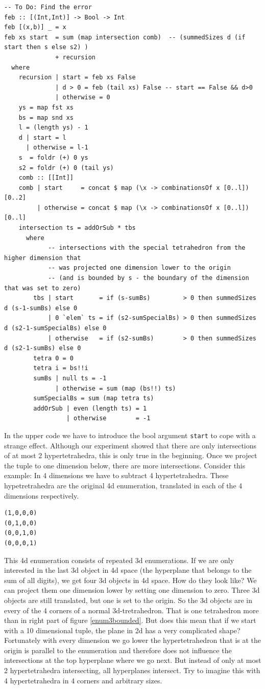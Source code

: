 \documentclass{tmr}
\begin{document}
\begin{Verbatim}
-- To Do: Find the error
feb :: [(Int,Int)] -> Bool -> Int
feb [(x,b)] _ = x
feb xs start  = sum (map intersection comb)  -- (summedSizes d (if start then s else s2) )
              + recursion
  where
    recursion | start = feb xs False
              | d > 0 = feb (tail xs) False -- start == False && d>0
              | otherwise = 0
    ys = map fst xs
    bs = map snd xs
    l = (length ys) - 1
    d | start = l
      | otherwise = l-1
    s  = foldr (+) 0 ys
    s2 = foldr (+) 0 (tail ys)
    comb :: [[Int]]
    comb | start     = concat $ map (\x -> combinationsOf x [0..l]) [0..2]
         | otherwise = concat $ map (\x -> combinationsOf x [0..l]) [0..l]
    intersection ts = addOrSub * tbs
      where
            -- intersections with the special tetrahedron from the higher dimension that 
            -- was projected one dimension lower to the origin
            -- (and is bounded by s - the boundary of the dimension that was set to zero)
        tbs | start       = if (s-sumBs)         > 0 then summedSizes d (s-1-sumBs) else 0
            | 0 `elem` ts = if (s2-sumSpecialBs) > 0 then summedSizes d (s2-1-sumSpecialBs) else 0
            | otherwise   = if (s2-sumBs)        > 0 then summedSizes d (s2-1-sumBs) else 0
        tetra 0 = 0
        tetra i = bs!!i
        sumBs | null ts = -1
              | otherwise = sum (map (bs!!) ts)
        sumSpecialBs = sum (map tetra ts)
        addOrSub | even (length ts) = 1
                 | otherwise        = -1
\end{Verbatim}

In the upper code we have to introduce the bool argument \verb|start| to cope with a strange effect.
Although our experiment showed that there are only intersections of at most 2 hypertetrahedra,
this is only true in the beginning. Once we project the tuple to one dimension below,
there are more intersections.
Consider this example: In 4 dimensions we have to subtract 4 hypertetrahedra.
These hypetretrahedra are the original 4d enumeration, translated in each of the
4 dimensions respectively. \eg
\begin{Verbatim}
(1,0,0,0)
(0,1,0,0)
(0,0,1,0)
(0,0,0,1)
\end{Verbatim}

This 4d enumeration consists of repeated 3d enumerations.
If we are only interested in the last 3d object in 4d space (the hyperplane that belongs 
to the sum of all digits), we get four 3d objects in 4d space. How do they look like? 
We can project them one dimension lower by setting one dimension to zero.
Three 3d objects are still translated, but one is set to the origin.
So the 3d objects are in every of the 4 corners of a normal 3d-tretrahedron.
That is one tetrahedron more than in right part of figure \ref{enum3bounded}.
But does this mean that if we start with a 10 dimensional tuple, the plane in 2d has a
very complicated shape? Fortunately with every dimension we go lower the hypertetrahedron 
that is at the origin is parallel to the enumeration and therefore does not influence 
the intersections at the top hyperplane where we go next. But instead of only at most 2 
hypertetrahedra intersecting, all hyperplanes intersect. Try to imagine this with 4 
hypertetrahedra in 4 corners and arbitrary sizes.
\end{document}
